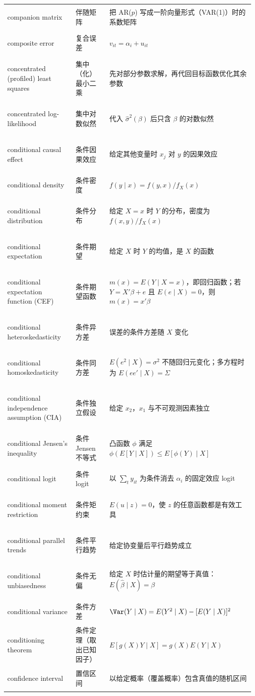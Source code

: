 \begin{longtable}{@{}>{\bfseries\boldmath\raggedright\arraybackslash}p{4.6cm}>{\raggedright\arraybackslash}p{3.2cm}>{\raggedright\arraybackslash}p{\dimexpr\textwidth-7.8cm-4\tabcolsep\relax}@{}}
companion matrix & 伴随矩阵 & 把 AR($p$) 写成一阶向量形式（VAR(1)）时的系数矩阵 \\
composite error & 复合误差 & $v_{it}=\alpha_i+u_{it}$ \\
concentrated (profiled) least squares & 集中（化）最小二乘 & 先对部分参数求解，再代回目标函数优化其余参数 \\
concentrated log-likelihood & 集中对数似然 & 代入 $\hat\sigma^2(\beta)$ 后只含 $\beta$ 的对数似然 \\
conditional causal effect & 条件因果效应 & 给定其他变量时 $x_j$ 对 $y$ 的因果效应 \\
conditional density & 条件密度 & $f(y\mid x)=f(y,x)/f_X(x)$ \\
conditional distribution & 条件分布 & 给定 $X=x$ 时 $Y$ 的分布，密度为 $f(x,y)/f_X(x)$ \\
conditional expectation & 条件期望 & 给定 $X$ 时 $Y$ 的均值，是 $X$ 的函数 \\
conditional expectation function (CEF) & 条件期望函数 & $m(x)=E(Y\mid X=x)$，即回归函数；若 $Y=X'\beta+e$ 且 $E(e\mid X)=0$，则 $m(x)=x'\beta$ \\
conditional heteroskedasticity & 条件异方差 & 误差的条件方差随 $X$ 变化 \\
conditional homoskedasticity & 条件同方差 & $E(e^2\mid X)=\sigma^2$ 不随回归元变化；多方程时为 $E(ee'\mid X)=\Sigma$ \\
conditional independence assumption (CIA) & 条件独立假设 & 给定 $x_2$，$x_1$ 与不可观测因素独立 \\
conditional Jensen's inequality & 条件 Jensen 不等式 & 凸函数 $\phi$ 满足 $\phi(E[Y\mid X])\le E[\phi(Y)\mid X]$ \\
conditional logit & 条件 logit & 以 $\sum_ty_{it}$ 为条件消去 $\alpha_i$ 的固定效应 logit \\
conditional moment restriction & 条件矩约束 & $E(u\mid z)=0$，使 $z$ 的任意函数都是有效工具 \\
conditional parallel trends & 条件平行趋势 & 给定协变量后平行趋势成立 \\
conditional unbiasedness & 条件无偏 & 给定 $X$ 时估计量的期望等于真值：$E(\hat\beta\mid X)=\beta$ \\
conditional variance & 条件方差 & $\Var(Y\mid X)=E(Y^2\mid X)-[E(Y\mid X)]^2$ \\
conditioning theorem & 条件定理（取出已知因子） & $E[g(X)Y\mid X]=g(X)E(Y\mid X)$ \\
confidence interval & 置信区间 & 以给定概率（覆盖概率）包含真值的随机区间 \\

\end{longtable}

